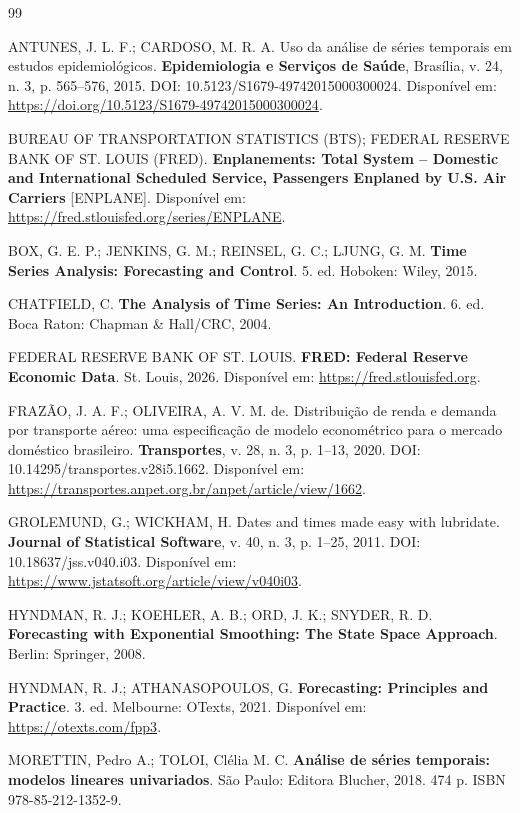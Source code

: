 \documentclass[12pt, a4paper]{article}
\begin{document}
\begin{thebibliography}{99}

ANTUNES, J. L. F.; CARDOSO, M. R. A. Uso da análise de séries temporais em estudos epidemiológicos. \textbf{Epidemiologia e Serviços de Saúde}, Brasília, v. 24, n. 3, p. 565--576, 2015. DOI: 10.5123/S1679-49742015000300024. Disponível em: \url{https://doi.org/10.5123/S1679-49742015000300024}.

BUREAU OF TRANSPORTATION STATISTICS (BTS); FEDERAL RESERVE BANK OF ST. LOUIS (FRED). \textbf{Enplanements: Total System -- Domestic and International Scheduled Service, Passengers Enplaned by U.S. Air Carriers} [ENPLANE]. Disponível em: \url{https://fred.stlouisfed.org/series/ENPLANE}.

BOX, G. E. P.; JENKINS, G. M.; REINSEL, G. C.; LJUNG, G. M. \textbf{Time Series Analysis: Forecasting and Control}. 5. ed. Hoboken: Wiley, 2015.

CHATFIELD, C. \textbf{The Analysis of Time Series: An Introduction}. 6. ed. Boca Raton: Chapman \& Hall/CRC, 2004.

FEDERAL RESERVE BANK OF ST. LOUIS. \textbf{FRED: Federal Reserve Economic Data}. St. Louis, 2026. Disponível em: \url{https://fred.stlouisfed.org}.

FRAZÃO, J. A. F.; OLIVEIRA, A. V. M. de. Distribuição de renda e demanda por transporte aéreo: uma especificação de modelo econométrico para o mercado doméstico brasileiro. \textbf{Transportes}, v. 28, n. 3, p. 1--13, 2020. DOI: 10.14295/transportes.v28i5.1662. Disponível em: \url{https://transportes.anpet.org.br/anpet/article/view/1662}.

GROLEMUND, G.; WICKHAM, H. Dates and times made easy with lubridate. \textbf{Journal of Statistical Software}, v. 40, n. 3, p. 1--25, 2011. DOI: 10.18637/jss.v040.i03. Disponível em: \url{https://www.jstatsoft.org/article/view/v040i03}.

HYNDMAN, R. J.; KOEHLER, A. B.; ORD, J. K.; SNYDER, R. D. \textbf{Forecasting with Exponential Smoothing: The State Space Approach}. Berlin: Springer, 2008.

HYNDMAN, R. J.; ATHANASOPOULOS, G. \textbf{Forecasting: Principles and Practice}. 3. ed. Melbourne: OTexts, 2021. Disponível em: \url{https://otexts.com/fpp3}.

MORETTIN, Pedro A.; TOLOI, Clélia M. C. \textbf{Análise de séries temporais: modelos lineares univariados}. São Paulo: Editora Blucher, 2018. 474 p. ISBN 978-85-212-1352-9.


\end{thebibliography}
\end{document}
